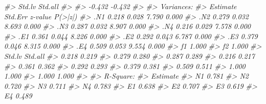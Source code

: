 \documentclass[
  11pt,
]{krantz}
\makeatletter
\newenvironment{Shaded}{\begin{snugshade}}{\end{snugshade}}
\newcommand{\CommentTok}[1]{\textcolor[rgb]{0.37,0.37,0.37}{\textit{#1}}}
\newenvironment{kframe}{%
\medskip{}
\setlength{\fboxsep}{.8em}
 \def\at@end@of@kframe{}%
 \ifinner\ifhmode%
  \def\at@end@of@kframe{\end{minipage}}%
  \begin{minipage}{\columnwidth}%
 \fi\fi%
 \def\FrameCommand##1{\hskip\@totalleftmargin \hskip-\fboxsep
 \colorbox{shadecolor}{##1}\hskip-\fboxsep
     \hskip-\linewidth \hskip-\@totalleftmargin \hskip\columnwidth}%
 \MakeFramed {\advance\hsize-\width
   \@totalleftmargin\z@ \linewidth\hsize
   \@setminipage}}%
 {\par\unskip\endMakeFramed%
 \at@end@of@kframe}
\renewenvironment{Shaded}{\begin{kframe}}{\end{kframe}}
\theoremstyle{definition}
\theoremstyle{definition}
\theoremstyle{definition}
\theoremstyle{definition}
\theoremstyle{remark}
\makeatother
\begin{document}
\begin{Shaded}
\begin{Highlighting}[]
\CommentTok{\#\textgreater{}    Std.lv  Std.all}
\CommentTok{\#\textgreater{}                   }
\CommentTok{\#\textgreater{}    {-}0.432   {-}0.432}
\CommentTok{\#\textgreater{} }
\CommentTok{\#\textgreater{} Variances:}
\CommentTok{\#\textgreater{}                    Estimate  Std.Err  z{-}value  P(\textgreater{}|z|)}
\CommentTok{\#\textgreater{}    .N1                0.218    0.028    7.790    0.000}
\CommentTok{\#\textgreater{}    .N2                0.279    0.032    8.693    0.000}
\CommentTok{\#\textgreater{}    .N3                0.287    0.032    8.907    0.000}
\CommentTok{\#\textgreater{}    .N4                0.216    0.029    7.578    0.000}
\CommentTok{\#\textgreater{}    .E1                0.361    0.044    8.226    0.000}
\CommentTok{\#\textgreater{}    .E2                0.292    0.043    6.787    0.000}
\CommentTok{\#\textgreater{}    .E3                0.379    0.046    8.315    0.000}
\CommentTok{\#\textgreater{}    .E4                0.509    0.053    9.554    0.000}
\CommentTok{\#\textgreater{}     f1                1.000                           }
\CommentTok{\#\textgreater{}     f2                1.000                           }
\CommentTok{\#\textgreater{}    Std.lv  Std.all}
\CommentTok{\#\textgreater{}     0.218    0.219}
\CommentTok{\#\textgreater{}     0.279    0.280}
\CommentTok{\#\textgreater{}     0.287    0.289}
\CommentTok{\#\textgreater{}     0.216    0.217}
\CommentTok{\#\textgreater{}     0.361    0.362}
\CommentTok{\#\textgreater{}     0.292    0.293}
\CommentTok{\#\textgreater{}     0.379    0.381}
\CommentTok{\#\textgreater{}     0.509    0.511}
\CommentTok{\#\textgreater{}     1.000    1.000}
\CommentTok{\#\textgreater{}     1.000    1.000}
\CommentTok{\#\textgreater{} }
\CommentTok{\#\textgreater{} R{-}Square:}
\CommentTok{\#\textgreater{}                    Estimate}
\CommentTok{\#\textgreater{}     N1                0.781}
\CommentTok{\#\textgreater{}     N2                0.720}
\CommentTok{\#\textgreater{}     N3                0.711}
\CommentTok{\#\textgreater{}     N4                0.783}
\CommentTok{\#\textgreater{}     E1                0.638}
\CommentTok{\#\textgreater{}     E2                0.707}
\CommentTok{\#\textgreater{}     E3                0.619}
\CommentTok{\#\textgreater{}     E4                0.489}
\end{Highlighting}
\end{Shaded}
\end{document}
